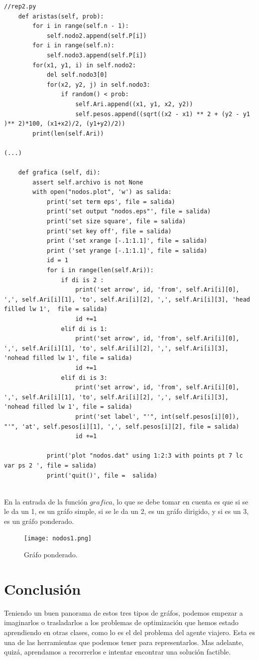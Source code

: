 \documentclass{article}%
\begin{document}
\begin{lstlisting}
//rep2.py
	def aristas(self, prob):
		for i in range(self.n - 1):
			self.nodo2.append(self.P[i])
		for i in range(self.n):
			self.nodo3.append(self.P[i])
		for(x1, y1, i) in self.nodo2:
			del self.nodo3[0]
			for(x2, y2, j) in self.nodo3:
				if random() < prob:
					self.Ari.append((x1, y1, x2, y2))
					self.pesos.append((sqrt((x2 - x1) ** 2 + (y2 - y1 )** 2)*100, (x1+x2)/2, (y1+y2)/2))
		print(len(self.Ari))

(...)		
		
	def grafica (self, di):
		assert self.archivo is not None
		with open("nodos.plot", 'w') as salida: 
			print('set term eps', file = salida)
			print('set output "nodos.eps"', file = salida)
			print('set size square', file = salida)
			print('set key off', file = salida)
			print ('set xrange [-.1:1.1]', file = salida)
			print ('set yrange [-.1:1.1]', file = salida)
			id = 1
			for i in range(len(self.Ari)):
				if di is 2 :
					print('set arrow', id, 'from', self.Ari[i][0], ',', self.Ari[i][1], 'to', self.Ari[i][2], ',', self.Ari[i][3], 'head filled lw 1',  file = salida)
					id +=1
				elif di is 1:
					print('set arrow', id, 'from', self.Ari[i][0], ',', self.Ari[i][1], 'to', self.Ari[i][2], ',', self.Ari[i][3], 'nohead filled lw 1', file = salida)
					id +=1
				elif di is 3:
					print('set arrow', id, 'from', self.Ari[i][0], ',', self.Ari[i][1], 'to', self.Ari[i][2], ',', self.Ari[i][3], 'nohead filled lw 1', file = salida)
					print('set label', "'", int(self.pesos[i][0]), "'", 'at', self.pesos[i][1], ',', self.pesos[i][2], file = salida)
					id +=1

			print('plot "nodos.dat" using 1:2:3 with points pt 7 lc var ps 2 ', file = salida)
			print('quit()', file =  salida)
		
\end{lstlisting}

En la entrada de la funci\'on $grafica$, lo que se debe tomar en cuenta es que si se le da un 1, es un gr\'afo simple, si se le da un 2, es un gr\'afo dirigido, y si es un 3, es un gr\'afo ponderado.
\begin{figure}[h]

\centering
\texttt{[image: nodos1.png]}

\caption{Gr\'afo ponderado.}
\end{figure}

\section*{Conclusi\'on}

Teniendo un buen panorama de estos tres tipos de gr\'afos, podemos empezar a imaginarlos o trasladarlos a los problemas de optimizaci\'on que hemos estado aprendiendo en otras clases, como lo es el del problema del agente viajero. Esta es una de las herramientas que podemos tener para representarlos. Mas adelante, quiz\'a, aprendamos a recorrerlos e intentar encontrar una soluci\'on factible.
\end{document}
